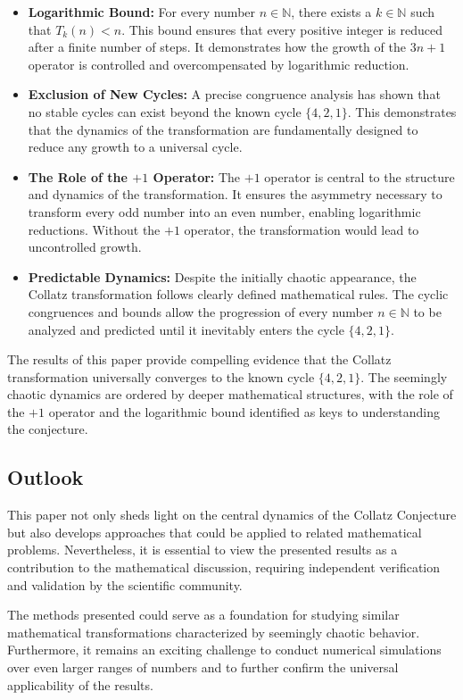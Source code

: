 \documentclass[a4paper,12pt]{article}
\begin{document}
\begin{itemize}
    \item \textbf{Logarithmic Bound:} For every number \( n \in \mathbb{N} \), there exists a \( k \in \mathbb{N} \) such that \( T_k(n) < n \). This bound ensures that every positive integer is reduced after a finite number of steps. It demonstrates how the growth of the \( 3n+1 \) operator is controlled and overcompensated by logarithmic reduction.
    \item \textbf{Exclusion of New Cycles:} A precise congruence analysis has shown that no stable cycles can exist beyond the known cycle \( \{4, 2, 1\} \). This demonstrates that the dynamics of the transformation are fundamentally designed to reduce any growth to a universal cycle.
    \item \textbf{The Role of the \(+1\) Operator:} The \(+1\) operator is central to the structure and dynamics of the transformation. It ensures the asymmetry necessary to transform every odd number into an even number, enabling logarithmic reductions. Without the \(+1\) operator, the transformation would lead to uncontrolled growth.
    \item \textbf{Predictable Dynamics:} Despite the initially chaotic appearance, the Collatz transformation follows clearly defined mathematical rules. The cyclic congruences and bounds allow the progression of every number \( n \in \mathbb{N} \) to be analyzed and predicted until it inevitably enters the cycle \( \{4, 2, 1\} \).
\end{itemize}

The results of this paper provide compelling evidence that the Collatz transformation universally converges to the known cycle \( \{4, 2, 1\} \). The seemingly chaotic dynamics are ordered by deeper mathematical structures, with the role of the \(+1\) operator and the logarithmic bound identified as keys to understanding the conjecture.

\subsection*{Outlook}
This paper not only sheds light on the central dynamics of the Collatz Conjecture but also develops approaches that could be applied to related mathematical problems. Nevertheless, it is essential to view the presented results as a contribution to the mathematical discussion, requiring independent verification and validation by the scientific community.

The methods presented could serve as a foundation for studying similar mathematical transformations characterized by seemingly chaotic behavior. Furthermore, it remains an exciting challenge to conduct numerical simulations over even larger ranges of numbers and to further confirm the universal applicability of the results.
\end{document}
